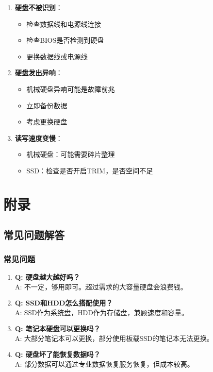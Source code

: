 \documentclass[12pt,UTF8]{ctexbook}
\begin{document}
\begin{enumerate}
    \item \textbf{硬盘不被识别}：
    \begin{itemize}[leftmargin=2em]
        \item 检查数据线和电源线连接
        \item 检查BIOS是否检测到硬盘
        \item 更换数据线或电源线
    \end{itemize}
    
    \item \textbf{硬盘发出异响}：
    \begin{itemize}[leftmargin=2em]
        \item 机械硬盘异响可能是故障前兆
        \item 立即备份数据
        \item 考虑更换硬盘
    \end{itemize}
    
    \item \textbf{读写速度变慢}：
    \begin{itemize}[leftmargin=2em]
        \item 机械硬盘：可能需要碎片整理
        \item SSD：检查是否开启TRIM，是否空间不足
    \end{itemize}
\end{enumerate}

\part{附录}

\chapter{常见问题解答}

\section{常见问题}

\begin{enumerate}
    \item \textbf{Q: 硬盘越大越好吗？}
    \\A: 不一定，够用即可。超过需求的大容量硬盘会浪费钱。
    
    \item \textbf{Q: SSD和HDD怎么搭配使用？}
    \\A: SSD作为系统盘，HDD作为存储盘，兼顾速度和容量。
    
    \item \textbf{Q: 笔记本硬盘可以更换吗？}
    \\A: 大部分笔记本可以更换，部分使用板载SSD的笔记本无法更换。
    
    \item \textbf{Q: 硬盘坏了能恢复数据吗？}
    \\A: 部分数据可以通过专业数据恢复服务恢复，但成本较高。
\end{enumerate}
\end{document}
